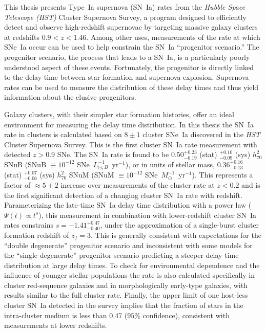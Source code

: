 
This thesis presents Type~Ia supernova (SN~Ia) rates from
the \emph{Hubble Space Telescope (HST)} Cluster Supernova Survey, a program
designed to efficiently detect and observe high-redshift supernovae by
targeting massive galaxy clusters at redshifts $0.9 < z <1.46$. Among
other uses, measurements of the rate at which SNe~Ia occur can be used
to help constrain the SN~Ia ``progenitor scenario.''  The progenitor
scenario, the process that leads to a SN~Ia, is a particularly poorly
understood aspect of these events. Fortunately, the progenitor is
directly linked to the delay time between star formation and supernova
explosion. Supernova rates can be used to measure the distribution of
these delay times and thus yield information about the elusive
progenitors.

Galaxy clusters, with their simpler star formation histories, offer an
ideal environment for measuring the delay time distribution. In this
thesis the SN~Ia rate in clusters is calculated based on $8 \pm 1$
cluster SNe~Ia discovered in the \emph{HST} Cluster Supernova
Survey. This is the first cluster SN~Ia rate measurement with detected
$z>0.9$ SNe. The SN~Ia rate is found to be $0.50^{+0.23}_{-0.19}$
(stat) $^{+0.10}_{-0.09}$ (sys) $h_{70}^2$ SNuB (SNuB $\equiv
10^{-12}$ SNe~$L_{\odot,B}^{-1}$~yr$^{-1}$), or in units of stellar
mass, $0.36^{+0.16}_{-0.13}$ (stat) $^{+0.07}_{-0.06}$ (sys)
$h_{70}^2$ SNuM (SNuM $\equiv 10^{-12}$
SNe~$M_\odot^{-1}$~yr$^{-1}$). This represents a factor of $\approx
5 \pm 2$ increase over measurements of the cluster rate at $z<0.2$ and
is the first significant detection of a changing cluster SN~Ia rate
with redshift. Parameterizing the late-time SN~Ia delay time
distribution with a power law ($\Psi(t) \propto t^s$), this
measurement in combination with lower-redshift cluster SN~Ia rates
constrains $s = -1.41^{+0.47}_{-0.40}$, under the approximation of a
single-burst cluster formation redshift of $z_f = 3$.  This is
generally consistent with expectations for the ``double degenerate''
progenitor scenario and inconsistent with some models for the ``single
degenerate'' progenitor scenario predicting a steeper delay time distribution at
large delay times.  To check for environmental dependence and the
influence of younger stellar populations the rate is also calculated
specifically in cluster red-sequence galaxies and in morphologically
early-type galaxies, with results similar to the full cluster
rate. Finally, the upper limit of one host-less cluster SN~Ia detected
in the survey implies that the fraction of stars in the intra-cluster
medium is less than 0.47 ($95\%$ confidence), consistent with
measurements at lower redshifts.

